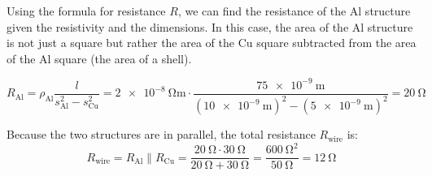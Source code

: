 \begin{enumerate}
{Using the formula for resistance $R$, we can find the resistance of the Al structure given the resistivity and the dimensions. In this case, the area of the Al structure is not just a square but rather the area of the Cu square subtracted from the area of the Al square (the area of a shell).

\[R_{\mathrm{Al}} = \rho_{\mathrm{Al}} \frac{l}{s_{\mathrm{Al}}^2 - s_{\mathrm{Cu}}^2} = \SI{2e-8}{\ohm\meter} \cdot \frac{\SI{75e-9}{\meter}}{\left(\SI{10e-9}{\meter}\right)^2 - \left(\SI{5e-9}{\meter}\right)^2} = \SI{20}{\ohm}\]

Because the two structures are in parallel, the total resistance $R_{\mathrm{wire}}$ is:
\[R_{\mathrm{wire}} = R_{\mathrm{Al}} \parallel R_{\mathrm{Cu}} = \frac{\SI{20}{\ohm} \cdot \SI{30}{\ohm}}{\SI{20}{\ohm} + \SI{30}{\ohm}} = \frac{\SI{600}{\ohm\squared}}{\SI{50}{\ohm}} = \SI{12}{\ohm}\]

}


\end{enumerate}

